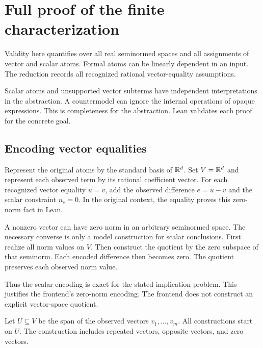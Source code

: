 \section{Full proof of the finite characterization}\label{app:proof}

Validity here quantifies over all real seminormed spaces and all assignments of vector and scalar atoms.
Formal atoms can be linearly dependent in an input.
The reduction records all recognized rational vector-equality assumptions.

Scalar atoms and unsupported vector subterms have independent interpretations in the abstraction.
A countermodel can ignore the internal operations of opaque expressions.
This is completeness for the abstraction.
Lean validates each proof for the concrete goal.

\subsection{Encoding vector equalities}
Represent the original atoms by the standard basis of $\mathbb{R}^d$.
Set $V=\mathbb{R}^d$ and represent each observed term by its rational coefficient vector.
For each recognized vector equality $u=v$, add the observed difference $e=u-v$ and the scalar constraint $n_e=0$.
In the original context, the equality proves this zero-norm fact in Lean.

A nonzero vector can have zero norm in an arbitrary seminormed space.
The necessary converse is only a model construction for scalar conclusions.
First realize all norm values on $V$.
Then construct the quotient by the zero subspace of that seminorm.
Each encoded difference then becomes zero.
The quotient preserves each observed norm value.

Thus the scalar encoding is exact for the stated implication problem.
This justifies the frontend's zero-norm encoding.
The frontend does not construct an explicit vector-space quotient.

Let $U\subseteq V$ be the span of the observed vectors $v_1,\ldots,v_m$.
All constructions start on $U$.
The construction includes repeated vectors, opposite vectors, and zero vectors.

